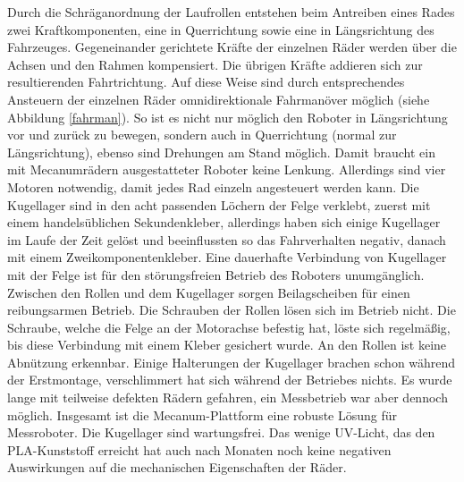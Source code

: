 \documentclass[a4paper,bibtotoc,oneside]{scrbook}
\begin{document}
\noindent Durch die Schräganordnung der Laufrollen entstehen beim Antreiben eines Rades zwei Kraftkomponenten, eine in Querrichtung sowie eine in Längsrichtung des Fahrzeuges. Gegeneinander gerichtete Kräfte der einzelnen Räder werden über die Achsen und den Rahmen kompensiert. Die übrigen Kräfte addieren sich zur resultierenden Fahrtrichtung. Auf diese Weise sind durch entsprechendes Ansteuern der einzelnen Räder omnidirektionale Fahrmanöver möglich (siehe Abbildung \ref{fahrman}). So ist es nicht nur möglich den Roboter in Längsrichtung vor und zurück zu bewegen, sondern auch in Querrichtung (normal zur Längsrichtung), ebenso sind Drehungen am Stand möglich. Damit braucht ein mit Mecanumrädern ausgestatteter Roboter keine Lenkung. Allerdings sind vier Motoren notwendig, damit jedes Rad einzeln angesteuert werden kann.   
Die Kugellager sind in den acht passenden Löchern der Felge verklebt, zuerst mit einem handelsüblichen Sekundenkleber, allerdings haben sich einige Kugellager im Laufe der Zeit gelöst und beeinflussten so das Fahrverhalten negativ, danach mit einem Zweikomponentenkleber. Eine dauerhafte Verbindung von Kugellager mit der Felge ist für den störungsfreien Betrieb des Roboters unumgänglich. 
Zwischen den Rollen und dem Kugellager sorgen Beilagscheiben für einen reibungsarmen Betrieb. 
Die Schrauben der Rollen lösen sich im Betrieb nicht. Die Schraube, welche die Felge an der Motorachse befestig hat, löste sich regelmäßig, bis diese Verbindung mit einem Kleber gesichert wurde.
An den Rollen ist keine Abnützung erkennbar. Einige Halterungen der Kugellager brachen schon während der Erstmontage, verschlimmert hat sich während der Betriebes nichts.
Es wurde lange mit teilweise defekten Rädern gefahren, ein Messbetrieb war aber dennoch möglich. Insgesamt ist die Mecanum-Plattform eine robuste Lösung für Messroboter.
Die Kugellager sind wartungsfrei. Das wenige UV-Licht, das den PLA-Kunststoff erreicht hat auch nach Monaten noch keine negativen Auswirkungen auf die mechanischen Eigenschaften der Räder.
\end{document}
